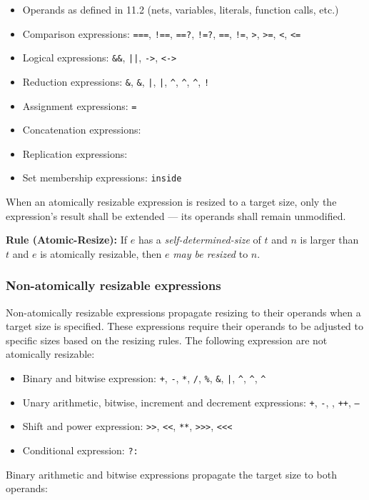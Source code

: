 \documentclass{article}
\newcommand{\tild}{\raisebox{-.7ex}{\textasciitilde{}}}
\newcommand{\sds}{\emph{self-determined-size}}
\newcommand{\mbr}{\emph{may be resized}}
\newenvironment{typingrule}[1]%
{\par\noindent\textbf{Rule (#1):} }%
{\par}
\newcommand{\binOp}{\texttt{+}, \texttt{-}, \texttt{*}, \texttt{/}, \texttt{\%},
\texttt{\&}, \texttt{|}, \texttt{\^{}}, \texttt{\^{}\tild},
\texttt{\tild\^{}}}
\newcommand{\unOp}{\texttt{+}, \texttt{-}, \texttt{\tild}, \texttt{++},
  \texttt{--}}
\newcommand{\shiftOp}{\texttt{>>}, \texttt{<}\texttt{<}, \texttt{**},
  \texttt{>>>}, \texttt{<}\texttt{<}\texttt{<}}
\newcommand{\compOp}{\texttt{===}, \texttt{!==}, \texttt{==?}, \texttt{!=?},
  \texttt{==}, \texttt{!=}, \texttt{>}, \texttt{>=}, \texttt{<}, \texttt{<=}}
\newcommand{\logicOp}{\texttt{\&\&}, \texttt{||}, \texttt{->}, \texttt{<->}}
\newcommand{\redOp}{\texttt{\&}, \texttt{\tild\&}, \texttt{|}, \texttt{\tild|},
\texttt{\^{}}, \texttt{\tild\^{}}, \texttt{\^{}\tild}, \texttt{!}}
\begin{document}
\begin{itemize}
  \item Operands as defined in 11.2 (nets, variables, literals, function
    calls, etc.)
  \item Comparison expressions: \compOp{}
  \item Logical expressions: \logicOp{}
  \item Reduction expressions: \redOp{}
  \item Assignment expressions: \texttt{=}
  \item Concatenation expressions: \texttt{\string{\dots\string}}
  \item Replication expressions: \texttt{}
  \item Set membership expressions: \texttt{inside}
\end{itemize}

When an atomically resizable expression is resized to a
target size, only the expression's result shall be extended --- its operands
shall remain unmodified.

\begin{typingrule}{Atomic-Resize}
  If $e$ has a \sds{} of $t$ and $n$ is larger than $t$
  and $e$ is atomically resizable, then $e$ \mbr{} to $n$.
\end{typingrule}

\subsubsection{Non-atomically resizable expressions}%

Non-atomically resizable expressions propagate resizing to their operands when
a target size is specified. These expressions require their operands to be
adjusted to specific sizes based on the resizing rules. The following expression
are not atomically resizable:

\begin{itemize}
  \item Binary and bitwise expression: \binOp{}
  \item Unary arithmetic, bitwise, increment and decrement expressions:
    \unOp{}
  \item Shift and power expression: \shiftOp{}
  \item Conditional expression: \texttt{?:}
\end{itemize}

Binary arithmetic and bitwise expressions propagate the target size to both
operands:
\end{document}

